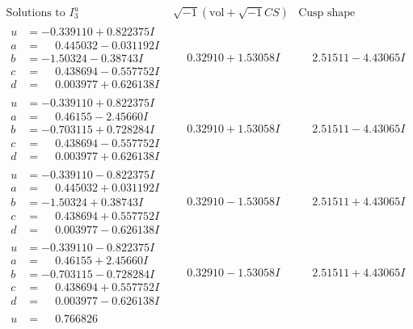 \documentclass[1p]{elsarticle_modified}
\theoremstyle{definition}
\newcommand{\I}{\sqrt{-1}}
\begin{document}
$$\begin{array}{c|c|c}  
\text{Solutions to }I^u_{3}& \I (\text{vol} + \sqrt{-1}CS) & \text{Cusp shape}\\
 \hline 
\begin{aligned}
u &= -0.339110 + 0.822375 I \\
a &= \phantom{-}0.445032 - 0.031192 I \\
b &= -1.50324 - 0.38743 I \\
c &= \phantom{-}0.438694 - 0.557752 I \\
d &= \phantom{-}0.003977 + 0.626138 I\end{aligned}
 & \phantom{-}0.32910 + 1.53058 I & \phantom{-}2.51511 - 4.43065 I \\ \hline\begin{aligned}
u &= -0.339110 + 0.822375 I \\
a &= \phantom{-}0.46155 - 2.45660 I \\
b &= -0.703115 + 0.728284 I \\
c &= \phantom{-}0.438694 - 0.557752 I \\
d &= \phantom{-}0.003977 + 0.626138 I\end{aligned}
 & \phantom{-}0.32910 + 1.53058 I & \phantom{-}2.51511 - 4.43065 I \\ \hline\begin{aligned}
u &= -0.339110 - 0.822375 I \\
a &= \phantom{-}0.445032 + 0.031192 I \\
b &= -1.50324 + 0.38743 I \\
c &= \phantom{-}0.438694 + 0.557752 I \\
d &= \phantom{-}0.003977 - 0.626138 I\end{aligned}
 & \phantom{-}0.32910 - 1.53058 I & \phantom{-}2.51511 + 4.43065 I \\ \hline\begin{aligned}
u &= -0.339110 - 0.822375 I \\
a &= \phantom{-}0.46155 + 2.45660 I \\
b &= -0.703115 - 0.728284 I \\
c &= \phantom{-}0.438694 + 0.557752 I \\
d &= \phantom{-}0.003977 - 0.626138 I\end{aligned}
 & \phantom{-}0.32910 - 1.53058 I & \phantom{-}2.51511 + 4.43065 I \\ \hline\begin{aligned}
u &= \phantom{-}0.766826\phantom{ +0.000000I} \\

\end{aligned}
\end{array}$$
\end{document}
